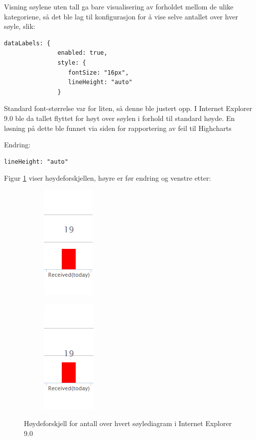 Visning søylene uten tall ga bare visualisering av forholdet mellom de ulike kategoriene, så det ble lag til konfigurasjon for å vise selve antallet over hver søyle, slik: 

\begin{lstlisting}
dataLabels: {
               enabled: true,
               style: {
                  fontSize: "16px",
                  lineHeight: "auto"
               }
\end{lstlisting}

Standard font-størrelse var for liten, så denne ble justert opp. I Internet Explorer 9.0 ble da tallet flyttet for høyt over søylen i forhold til standard høyde. En løsning på dette ble funnet via siden for rapportering av feil til Highcharts \cite{iebug} 

Endring:

\begin{lstlisting}
lineHeight: "auto"
\end{lstlisting}

Figur \ref{IE_bug} viser høydeforskjellen, høyre er før endring og venstre etter:

\begin{figure}[H]
\centering
\begin{subfigure}
  \centering
  \includegraphics[scale=0.7]{img/IE_footprints_bug}
\end{subfigure}
\begin{subfigure}
  \centering
  \includegraphics[scale=0.7]{img/IE_footprints_fix}
\end{subfigure}
\caption{Høydeforskjell for antall over hvert søylediagram i Internet Explorer 9.0}
\label{IE_bug}
\end{figure}



